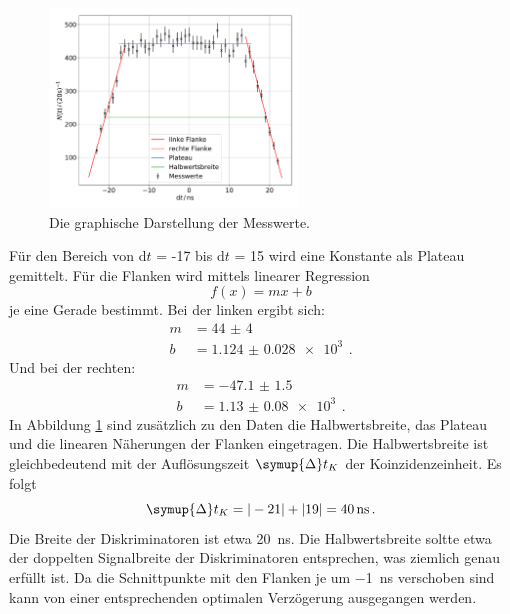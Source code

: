 \documentclass[
  bibliography=totoc,     %
  captions=tableheading,  %
  titlepage=firstiscover, %
]{scrartcl}
\begin{document}
\begin{figure}
  \centering
  \includegraphics[width=0.59\textwidth]{Plateau20.pdf}
  \caption{Die graphische Darstellung der Messwerte.}
  \label{fig:2}
\end{figure}
\noindent
Für den Bereich von d$t$ = -17 bis d$t$ = 15 wird eine Konstante als Plateau gemittelt.
Für die Flanken wird mittels linearer Regression
\begin{equation*}
  f(x) = mx + b
\end{equation*}
je eine Gerade bestimmt.
Bei der linken ergibt sich:
\begin{align}
  m &= \SI{44(4)}{} \\
  b &= \SI{1.124(28)e3}{} \, .
\end{align}
Und bei der rechten:
\begin{align}
  m &= \SI{-47.1(15)}{} \\
  b &= \SI{1.13(8)e3}{} \, .
\end{align}
In Abbildung \ref{fig:2} sind zusätzlich zu den Daten die Halbwertsbreite, das
Plateau und die linearen Näherungen der Flanken eingetragen.
Die Halbwertsbreite ist gleichbedeutend mit der Auflösungszeit
$\symup{\Delta}t_K$ der Koinzidenzeinheit.
Es folgt
\begin{equation}
  \symup{\Delta}t_K = |-21| + |19| = \SI{40}{\nano\second} \, .
\end{equation}
Die Breite der Diskriminatoren ist etwa \SI{20}{\nano\second}. Die Halbwertsbreite soltte
etwa der doppelten Signalbreite der Diskriminatoren entsprechen, was ziemlich genau
erfüllt ist. Da die Schnittpunkte mit den Flanken je um \SI{-1}{\nano\second} verschoben
sind kann von einer entsprechenden optimalen Verzögerung ausgegangen werden.
\end{document}
